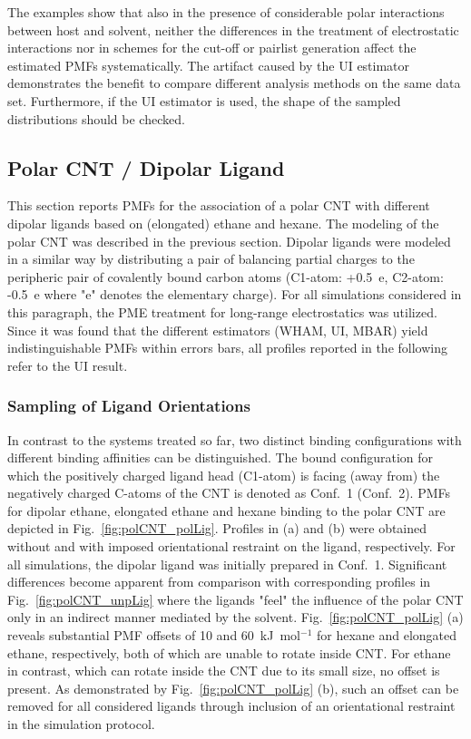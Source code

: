 \documentclass[9pt,lessons,pubversion]{livecoms}
\begin{document}
The examples show that also in the presence of considerable polar interactions between host and solvent, 
neither the differences in the treatment of electrostatic interactions nor in schemes for the cut-off or pairlist generation affect the estimated PMFs systematically.
The  artifact caused by the UI estimator demonstrates the benefit to compare different analysis methods on the same data set.
Furthermore, if the UI estimator is used, the shape of the sampled distributions should be checked.

\subsection{Polar CNT / Dipolar Ligand}
\label{subsec:pol_host_pol_lig}

This section reports PMFs for the association of a polar CNT with different dipolar ligands based on (elongated) ethane and hexane.
The modeling of the polar CNT was described in the previous section. 
Dipolar ligands were modeled in a similar way by distributing a pair of balancing partial charges  to the peripheric pair of covalently bound carbon atoms 
(C1-atom: +0.5~e, C2-atom: -0.5~e where "e" denotes the elementary charge).
For all simulations considered in this paragraph, the PME treatment for long-range electrostatics was utilized.
Since it was found that the different estimators (WHAM, UI, MBAR) yield indistinguishable PMFs within errors bars, all profiles reported in the following refer to the UI result.

\subsubsection*{Sampling of Ligand Orientations}

In contrast to the systems treated so far, two distinct binding configurations with different binding affinities can be distinguished. 
The bound configuration for which the positively charged ligand head (C1-atom) is facing (away from) the negatively charged C-atoms of the CNT is denoted as Conf.~1 (Conf.~2).
PMFs for dipolar ethane, elongated ethane and hexane binding to the polar CNT are depicted in Fig.~\ref{fig:polCNT_polLig}.  
Profiles in (a) and (b) were obtained without and with imposed orientational restraint on the ligand, respectively.
For all simulations, the dipolar ligand was initially prepared in Conf.~1.
Significant differences become apparent from comparison with corresponding profiles in Fig.~\ref{fig:polCNT_unpLig} where the ligands "feel" the influence of the polar CNT only in an indirect manner mediated by the solvent.
Fig.~\ref{fig:polCNT_polLig} (a) reveals substantial PMF offsets of 10 and 60~kJ~mol$^{-1}$ for hexane and elongated ethane, respectively, both of which are unable to rotate inside CNT.
For ethane in contrast, which can rotate inside the CNT due to its small size, no offset is present. 
As demonstrated by Fig.~\ref{fig:polCNT_polLig} (b), such an offset can be removed for all considered ligands through inclusion of an orientational restraint in the simulation protocol.
\end{document}
